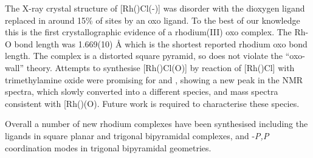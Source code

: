 The X-ray crystal structure of [Rh(\tBuxantphos)Cl(-)] was disorder with the dioxygen ligand replaced in around 15\% of sites by an oxo ligand.  To the best of our knowledge this is the first crystallographic evidence of a rhodium(III) oxo complex.  The Rh-O bond length was 1.669(10) \si{\angstrom} which is the shortest reported rhodium oxo bond length.  The complex is a distorted square pyramid, so does not violate the ``oxo-wall'' theory.  Attempts to synthesise [Rh(\tBuxantphosk)Cl(O)] by reaction of [Rh(\tBuxantphosk)Cl] with trimethylamine oxide were promising for \tButhixantphos{} and \tBuxantphos{}, showing a new peak in the \phosphorus{} NMR spectra, which slowly converted into a different species, and mass spectra consistent with [Rh(\tBuxantphosk)(O)\ce{]+}.  Future work is required to characterise these species.  

Overall a number of new rhodium complexes have been synthesised including the \tBuxantphos{} ligands in \POP{} square planar and trigonal bipyramidal complexes, and \dento{}-\emph{P,P}\textprime{} coordination modes in trigonal bipyramidal geometries.  

















